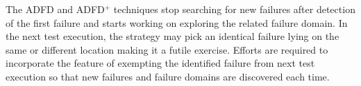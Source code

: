 The ADFD and ADFD$^+$ techniques stop searching for new failures after detection of the first failure and starts working on exploring the related failure domain. In the next test execution, the strategy may pick an identical failure lying on the same or different location making it a futile exercise. Efforts are required to incorporate the feature of exempting the identified failure from next test execution so that new failures and failure domains are discovered each time.\\





